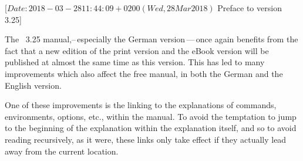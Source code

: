 %
%
%
%
%
%
%
%
%

                 [$Date: 2018-03-28 11:44:09 +0200 (Wed, 28 Mar 2018) $
                  Preface to version 3.25]



The \KOMAScript~3.25 manual,\---\,especially the German version\,---\,once
again benefits from the fact that a new edition of the print version
\cite{book:komascript} and the eBook version \cite{ebook:komascript} will be
published at almost the same time as this version. This has led to many
improvements which also affect the free manual, in both the German and the
English version.

One of these improvements is the linking to the explanations of commands,
environments, options, etc., within the manual. To avoid the temptation to
jump to the beginning of the explanation within the explanation itself, and
so to avoid reading recursively, as it were, these links only take effect
if they actually lead away from the current location.

